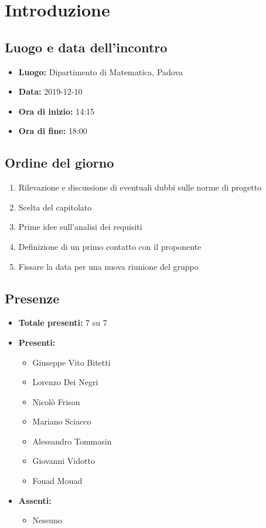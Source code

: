 \section*{Introduzione}

\subsection*{Luogo e data dell'incontro}
	\begin{itemize}
		\item \textbf{Luogo:} Dipartimento di Matematica, Padova
		\item \textbf{Data:} 2019-12-10
		\item \textbf{Ora di inizio:} 14:15
		\item \textbf{Ora di fine:} 18:00
	\end{itemize}

\subsection*{Ordine del giorno}
	\begin{enumerate}
		\item Rilevazione e discussione di eventuali dubbi sulle norme di progetto
		\item Scelta del capitolato
		\item Prime idee sull'analisi dei requisiti
		\item Definizione di un primo contatto con il proponente
		\item Fissare la data per una nuova riunione del gruppo
	\end{enumerate}

\subsection*{Presenze}
	\begin{itemize}
		\item \textbf{Totale presenti:} 7 su 7
		\item \textbf{Presenti: }
			\begin{itemize}			
				\item Giuseppe Vito Bitetti
				\item Lorenzo Dei Negri
				\item Nicolò Frison
				\item Mariano Sciacco
				\item Alessandro Tommasin
				\item Giovanni Vidotto
				\item Fouad Mouad
			\end{itemize}
		\item \textbf{Assenti: } 
			\begin{itemize}	
				\item Nessuno
			\end{itemize}
	\end{itemize}



